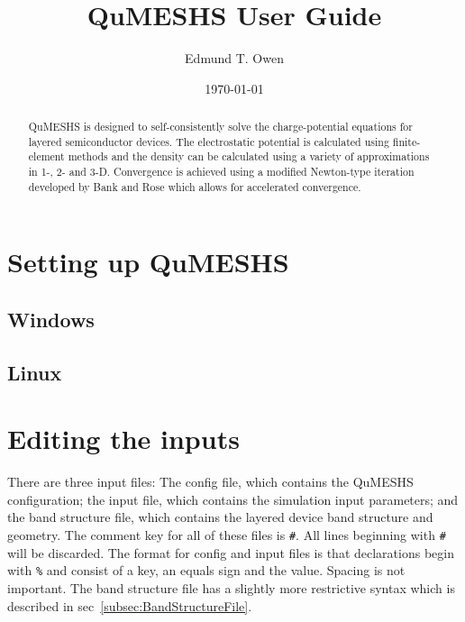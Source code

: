 \documentclass[12pt]{article}
\newcommand{\commentout}[1]{}
\begin{document}
\title{QuMESHS User Guide}%
\author{Edmund T. Owen}%
\date{\today}%
\begin{abstract}
  QuMESHS is designed to self-consistently solve the charge-potential equations
  for layered semiconductor devices.  The electrostatic potential is calculated using
  finite-element methods and the density can be calculated using a variety of
  approximations in 1-, 2- and 3-D.  Convergence is achieved using a modified
  Newton-type iteration developed by Bank and Rose which allows for accelerated
  convergence.
\end{abstract}
\maketitle

\tableofcontents
\newpage

\commentout{
\section{Overview}
}

\section{Setting up QuMESHS}

\subsection{Windows}
\label{subsec:SetupWindows}

\subsection{Linux}
\label{subsec:SetupLinux}

\section{Editing the inputs}

There are three input files: The config file, which contains the QuMESHS configuration;
the input file, which contains the simulation input parameters; and the band structure
file, which contains the layered device band structure and geometry.  The comment key
for all of these files is \texttt{\#}.  All lines beginning with \texttt{\#} will be
discarded.  The format for config and input files is that declarations begin with
\texttt{\%} and consist of a key, an equals sign and the value.  Spacing is not important.
The band structure file has a slightly more restrictive syntax which is described in
sec~\ref{subsec:BandStructureFile}.
\end{document}
